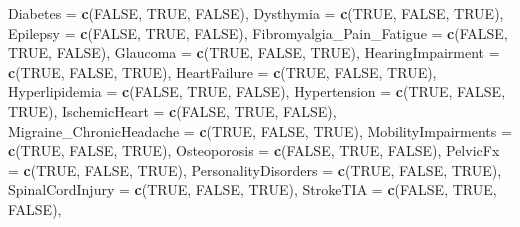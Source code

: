 \documentclass[
]{article}
\newenvironment{Shaded}{\begin{snugshade}}{\end{snugshade}}
\newcommand{\AttributeTok}[1]{\textcolor[rgb]{0.13,0.29,0.53}{#1}}
\newcommand{\ConstantTok}[1]{\textcolor[rgb]{0.56,0.35,0.01}{#1}}
\newcommand{\FunctionTok}[1]{\textcolor[rgb]{0.13,0.29,0.53}{\textbf{#1}}}
\newcommand{\NormalTok}[1]{#1}
\begin{document}
\begin{Shaded}
\begin{Highlighting}[]
  \AttributeTok{Diabetes =} \FunctionTok{c}\NormalTok{(}\ConstantTok{FALSE}\NormalTok{, }\ConstantTok{TRUE}\NormalTok{, }\ConstantTok{FALSE}\NormalTok{),}
  \AttributeTok{Dysthymia =} \FunctionTok{c}\NormalTok{(}\ConstantTok{TRUE}\NormalTok{, }\ConstantTok{FALSE}\NormalTok{, }\ConstantTok{TRUE}\NormalTok{),}
  \AttributeTok{Epilepsy =} \FunctionTok{c}\NormalTok{(}\ConstantTok{FALSE}\NormalTok{, }\ConstantTok{TRUE}\NormalTok{, }\ConstantTok{FALSE}\NormalTok{),}
  \AttributeTok{Fibromyalgia\_Pain\_Fatigue =} \FunctionTok{c}\NormalTok{(}\ConstantTok{FALSE}\NormalTok{, }\ConstantTok{TRUE}\NormalTok{, }\ConstantTok{FALSE}\NormalTok{),}
  \AttributeTok{Glaucoma =} \FunctionTok{c}\NormalTok{(}\ConstantTok{TRUE}\NormalTok{, }\ConstantTok{FALSE}\NormalTok{, }\ConstantTok{TRUE}\NormalTok{),}
  \AttributeTok{HearingImpairment =} \FunctionTok{c}\NormalTok{(}\ConstantTok{TRUE}\NormalTok{, }\ConstantTok{FALSE}\NormalTok{, }\ConstantTok{TRUE}\NormalTok{),}
  \AttributeTok{HeartFailure =} \FunctionTok{c}\NormalTok{(}\ConstantTok{TRUE}\NormalTok{, }\ConstantTok{FALSE}\NormalTok{, }\ConstantTok{TRUE}\NormalTok{),}
  \AttributeTok{Hyperlipidemia =} \FunctionTok{c}\NormalTok{(}\ConstantTok{FALSE}\NormalTok{, }\ConstantTok{TRUE}\NormalTok{, }\ConstantTok{FALSE}\NormalTok{),}
  \AttributeTok{Hypertension =} \FunctionTok{c}\NormalTok{(}\ConstantTok{TRUE}\NormalTok{, }\ConstantTok{FALSE}\NormalTok{, }\ConstantTok{TRUE}\NormalTok{),}
  \AttributeTok{IschemicHeart =} \FunctionTok{c}\NormalTok{(}\ConstantTok{FALSE}\NormalTok{, }\ConstantTok{TRUE}\NormalTok{, }\ConstantTok{FALSE}\NormalTok{),}
  \AttributeTok{Migraine\_ChronicHeadache =} \FunctionTok{c}\NormalTok{(}\ConstantTok{TRUE}\NormalTok{, }\ConstantTok{FALSE}\NormalTok{, }\ConstantTok{TRUE}\NormalTok{),}
  \AttributeTok{MobilityImpairments =} \FunctionTok{c}\NormalTok{(}\ConstantTok{TRUE}\NormalTok{, }\ConstantTok{FALSE}\NormalTok{, }\ConstantTok{TRUE}\NormalTok{),}
  \AttributeTok{Osteoporosis =} \FunctionTok{c}\NormalTok{(}\ConstantTok{FALSE}\NormalTok{, }\ConstantTok{TRUE}\NormalTok{, }\ConstantTok{FALSE}\NormalTok{),}
  \AttributeTok{PelvicFx =} \FunctionTok{c}\NormalTok{(}\ConstantTok{TRUE}\NormalTok{, }\ConstantTok{FALSE}\NormalTok{, }\ConstantTok{TRUE}\NormalTok{),}
  \AttributeTok{PersonalityDisorders =} \FunctionTok{c}\NormalTok{(}\ConstantTok{TRUE}\NormalTok{, }\ConstantTok{FALSE}\NormalTok{, }\ConstantTok{TRUE}\NormalTok{),}
  \AttributeTok{SpinalCordInjury =} \FunctionTok{c}\NormalTok{(}\ConstantTok{TRUE}\NormalTok{, }\ConstantTok{FALSE}\NormalTok{, }\ConstantTok{TRUE}\NormalTok{),}
  \AttributeTok{StrokeTIA =} \FunctionTok{c}\NormalTok{(}\ConstantTok{FALSE}\NormalTok{, }\ConstantTok{TRUE}\NormalTok{, }\ConstantTok{FALSE}\NormalTok{),}

\end{Highlighting}
\end{Shaded}
\end{document}
